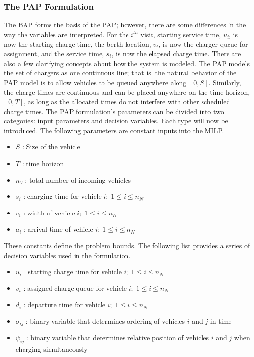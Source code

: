 \documentclass[11pt,a4paper,final]{article}
\begin{document}
\subsubsection{The PAP Formulation}
\label{sec:the-pap-formulation}
The BAP forms the basis of the PAP; however, there are some differences in the way the variables are interpreted. For the
\(i^{th}\) visit, starting service time, \(u_i\), is now the starting charge time, the berth location, \(v_i\), is now the
charger queue for assignment, and the service time, \(s_i\), is now the elapsed charge time. There are also a few clarifying concepts
about how the system is modeled. The PAP models the set of chargers as one continuous line; that is, the natural
behavior of the PAP model is to allow vehicles to be queued anywhere along \([0,S]\). Similarly, the charge times are
continuous and can be placed anywhere on the time horizon, \([0,T]\), as long as the allocated times do not interfere with
other scheduled charge times. The PAP formulation's parameters can be divided into two categories: input parameters and
decision variables. Each type will now be introduced. The following parameters are constant inputs into the MILP.

\begin{itemize}
	\item $S$   : Size of the vehicle
	\item $T$   : time horizon
	\item $n_V$ : total number of incoming vehicles
	\item $s_i$ : charging time for vehicle $i;\; 1 \leq i \leq n_N$
	\item $s_i$ : width of vehicle $i;\; 1 \leq i \leq n_N$
	\item $a_i$ : arrival time of vehicle $i;\; 1 \leq i \leq n_N$
\end{itemize}

These constants define the problem bounds. The following list provides a series of decision variables used in the
formulation.

\begin{itemize}
    \item $u_i$    : starting charge time for vehicle $i;\; 1 \leq i \leq n_N$
    \item $v_i$    : assigned charge queue for vehicle $i;\; 1 \leq i \leq n_N$
    \item $d_i$    : departure time for vehicle $i;\; 1 \leq i \leq n_N$
    \item $\sigma_{ij}$ : binary variable that determines ordering of vehicles $i$ and $j$ in time
    \item $\psi_{ij}$ : binary variable that determines relative position of vehicles $i$ and $j$ when charging simultaneously
\end{itemize}
\end{document}
